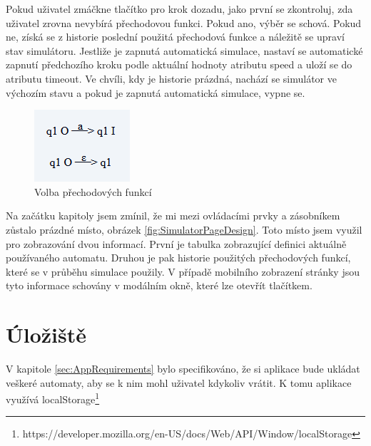 Pokud uživatel zmáčkne tlačítko pro krok dozadu, jako první se zkontroluj, zda uživatel zrovna nevybírá přechodovou funkci. Pokud ano, výběr se schová. Pokud ne, získá se z historie poslední použitá přechodová funkce a náležitě se upraví stav simulátoru. Jestliže je zapnutá automatická simulace, nastaví se automatické zapnutí předchozího kroku podle aktuální hodnoty atributu speed a uloží se do atributu timeout. Ve chvíli, kdy je historie prázdná, nachází se simulátor ve výchozím stavu a pokud je zapnutá automatická simulace, vypne se.

\begin{figure}[h]
    \centering
    \includegraphics{Figures/PrntScrn_TransitionFunctionChoosing.png}
    \caption{Volba přechodových funkcí}\label{fig:TransitionFunctionChoosing}
\end{figure}

Na začátku kapitoly jsem zmínil, že mi mezi ovládacími prvky a zásobníkem zůstalo prázdné místo, obrázek \ref{fig:SimulatorPageDesign}. Toto místo jsem využil pro zobrazování dvou informací. První je tabulka zobrazující definici aktuálně používaného automatu. Druhou je pak historie použitých přechodových funkcí, které se v průběhu simulace použily. V případě mobilního zobrazení stránky jsou tyto informace schovány v modálním okně, které lze otevřít tlačítkem.

\section{Úložiště}
V kapitole \ref{sec:AppRequirements} bylo specifikováno, že si aplikace bude ukládat veškeré automaty, aby se k nim mohl uživatel kdykoliv vrátit. K tomu aplikace využívá localStorage\footnote{https://developer.mozilla.org/en-US/docs/Web/API/Window/localStorage}


\endinput
